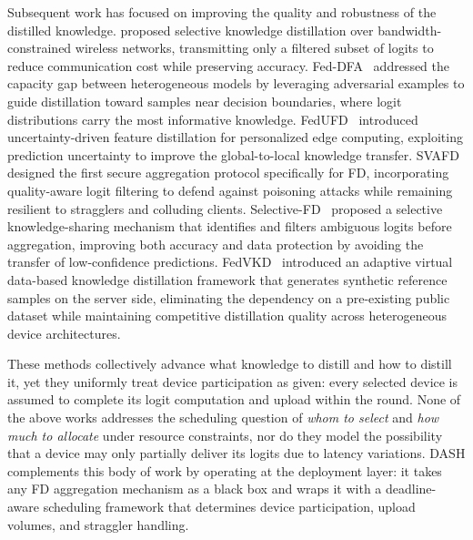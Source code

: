 \documentclass[a4paper,fleqn]{cas-dc}
\begin{document}
	Subsequent work has focused on improving the quality and robustness
	of the distilled knowledge. \citet{gad_fedskd_2024}
	proposed selective knowledge distillation over bandwidth-constrained
	wireless networks, transmitting only a filtered subset of logits to
	reduce communication cost while preserving accuracy.
	Fed-DFA~\citep{wu_feddfa_2024} addressed the capacity gap between
	heterogeneous models by leveraging adversarial examples to guide
	distillation toward samples near decision boundaries, where logit
	distributions carry the most informative knowledge.
	FedUFD~\citep{shao_fedufd_2025} introduced uncertainty-driven feature
	distillation for personalized edge computing, exploiting prediction
	uncertainty to improve the global-to-local knowledge transfer.
	SVAFD~\citep{chen_svafd_2025} designed the first secure aggregation
	protocol specifically for FD, incorporating quality-aware logit
	filtering to defend against poisoning attacks while remaining
	resilient to stragglers and colluding clients.
	Selective-FD~\citep{shao_selective_fd_2023} proposed a selective
	knowledge-sharing mechanism that identifies and filters ambiguous
	logits before aggregation, improving both accuracy and data protection
	by avoiding the transfer of low-confidence predictions.
	FedVKD~\citep{he_fedvkd_2026} introduced an adaptive virtual
	data-based knowledge distillation framework that generates synthetic
	reference samples on the server side, eliminating the dependency on a
	pre-existing public dataset while maintaining competitive distillation
	quality across heterogeneous device architectures.
	
	These methods collectively advance what knowledge to distill and how
	to distill it, yet they uniformly treat device participation as
	given: every selected device is assumed to complete its logit
	computation and upload within the round. None of the above works
	addresses the scheduling question of \emph{whom to select} and
	\emph{how much to allocate} under resource constraints, nor do they
	model the possibility that a device may only partially deliver its
	logits due to latency variations. DASH complements this body of work
	by operating at the deployment layer: it takes any FD aggregation
	mechanism as a black box and wraps it with a deadline-aware scheduling
	framework that determines device participation, upload volumes, and
	straggler handling.
	
\end{document}
